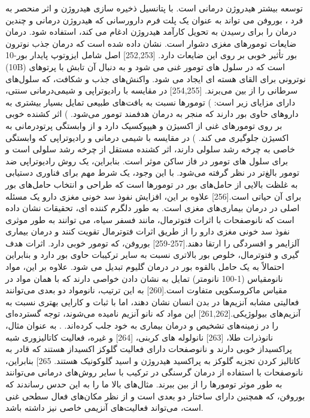 توسعه بیشتر هیدروژن درمانی است. با پتانسیل ذخیره سازی هیدروژن و اثر منحصر به فرد ، بوروفن می تواند به عنوان یک پلت فرم دارورسانی که هیدروژن درمانی و چندین درمان را برای رسیدن به تحویل کارآمد هیدروژن ادغام می کند، استفاده شود. درمان ضایعات تومورهای مغزی دشوار است. نشان داده شده است که درمان جذب نوترون بور  تأثیر خوبی بر روی این ضایعات دارد. [252,253] اصل  شامل ایزوتوپ پایدار بور-10 (10B) است که در سلول های تومور غنی می شود و به دنبال آن تابش با پرتوهای نوترونی برای القای هسته ای ایجاد می شود. واکنش‌های جذب و شکافت، که سلول‌های سرطانی را از بین می‌برند. [254,255] در مقایسه با رادیوتراپی و شیمی‌درمانی سنتی،  دارای مزایای زیر است: ) تومورها نسبت به بافت‌های طبیعی تمایل بسیار بیشتری به داروهای حاوی بور دارند که منجر به درمان هدفمند تومور می‌شود. )  اثر کشنده خوبی بر روی تومورهای غنی از اکسیژن و هیپوکسیک دارد و از وابستگی پرتودرمانی به اکسیژن جلوگیری می کند. ) در مقایسه با شیمی درمانی و رادیوتراپی که وابستگی خاصی به چرخه رشد سلولی دارند، اثر کشنده  مستقل از چرخه رشد سلولی است و برای سلول های تومور در فاز ساکن موثر است.
بنابراین،  یک روش رادیوتراپی ضد تومور بالغ‌تر در نظر گرفته می‌شود. با این وجود، یک شرط مهم برای فناوری  دستیابی به غلظت بالایی از حامل‌های بور در تومورها است که طراحی و انتخاب حامل‌های بور برای آن حیاتی است.[256] علاوه بر این، افزایش نفوذ سد خونی مغزی دارو یک مسئله اصلی در درمان بیماری‌های مغزی است. به طور دلگرم کننده ای، تحقیقات نشان داده است که نانوصفحات با اثرات فتوترمال، مانند فسفر سیاه، می توانند به طور موثری نفوذ سد خونی مغزی دارو را از طریق اثرات فتوترمال تقویت کنند و درمان بیماری آلزایمر و افسردگی را ارتقا دهند.[257-259] بوروفن، که تومور خوبی دارد. اثرات هدف گیری و فتوترمال، خلوص بور بالاتری نسبت به سایر ترکیبات حاوی بور دارد و بنابراین احتمالاً به یک حامل بالقوه بور در درمان گلیوم تبدیل می شود. علاوه بر این، مواد نانومقیاس (1-100 نانومتر) تمایل به نشان دادن خواصی دارند که با همان مواد در مقیاس ماکروسکوپی متفاوت است.[260] به این ترتیب، نانومواد دو بعدی می‌توانند فعالیتی مشابه آنزیم‌ها در بدن انسان نشان دهند، اما با ثبات و کارایی بهتری نسبت به آنزیم‌های بیولوژیکی.[261,262] این مواد که نانو آنزیم نامیده می‌شوند، توجه گسترده‌ای را در زمینه‌های تشخیص و درمان بیماری به خود جلب کرده‌اند. . به عنوان مثال، نانوذرات طلا، [263] نانولوله های کربنی، [264] و غیره، فعالیت کاتالیزوری شبه پراکسیداز خوبی دارند و نانوصفحات  دارای فعالیت گلوکز اکسیداز هستند که قادر به کاتالیز کردن تجزیه گلوکز به پراکسید هیدروژن و اسید گلوکونیک هستند. 265] بنابراین، نانوصفحات  با استفاده از درمان گرسنگی در ترکیب با سایر روش‌های درمانی می‌توانند به طور موثر تومورها را از بین ببرند. مثال‌های بالا ما را به این حدس رساندند که بوروفن، که همچنین دارای ساختار دو بعدی است و از نظر مکان‌های فعال سطحی غنی است، می‌تواند فعالیت‌های آنزیمی خاصی نیز داشته باشد.
